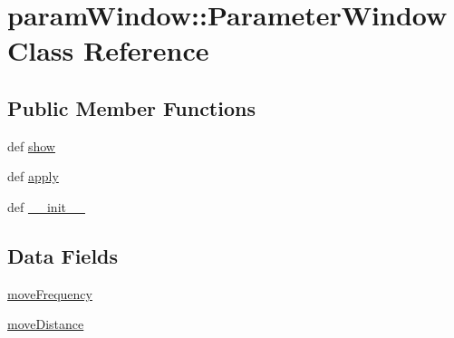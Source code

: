 \hypertarget{classparamWindow_1_1ParameterWindow}{
\section{paramWindow::ParameterWindow Class Reference}
\label{classparamWindow_1_1ParameterWindow}
}
\subsection*{Public Member Functions}
\begin{CompactItemize}
\item 
def \hyperlink{classparamWindow_1_1ParameterWindow_8963aedcc45910d9681cda72e767c7f5}{show}
\item 
def \hyperlink{classparamWindow_1_1ParameterWindow_e59c85e019d7706bfb30f0a9f8ec44d9}{apply}
\item 
def \hyperlink{classparamWindow_1_1ParameterWindow_305ce87d371ae4925b1bbae54e644454}{\_\-\_\-init\_\-\_\-}
\end{CompactItemize}
\subsection*{Data Fields}
\begin{CompactItemize}
\item 
\hyperlink{classparamWindow_1_1ParameterWindow_4df11e2ce10b94d8ad134614c5cbc7ae}{moveFrequency}
\item 
\hyperlink{classparamWindow_1_1ParameterWindow_4e0578fbe7b8aca7093f6f48205df974}{moveDistance}
\end{CompactItemize}

